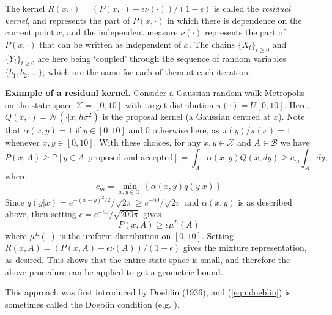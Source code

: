 \documentclass{article}
\newcommand{\ch}[1]{ \{#1_t\}_{t \geq 0} }
\newcommand{\X}{\mathcal{X}}
\newcommand{\B}{\mathcal{B}}
\begin{document}
The kernel $R(x,\cdot) = (P(x,\cdot) - \epsilon\nu(\cdot))/(1-\epsilon)$ is called the \emph{residual kernel}, and represents the part of $P(x,\cdot)$ in which there is dependence on the current point $x$, and the independent measure $\nu(\cdot)$ represents the part of $P(x,\cdot)$ that can be written as independent of $x$.  The chains $\ch{X}$ and $\ch{Y}$ are here being `coupled' through the sequence of random variables $\{b_1,b_2,...\}$, which are the same for each of them at each iteration.

\vspace{0.3cm}

{\color{darkblue}
\textbf{Example of a residual kernel.}  Consider a Gaussian random walk Metropolis on the state space $\X = [0,10]$ with target distribution $\pi(\cdot) = U[0,10]$. Here,  $Q(x,\cdot) = \mathcal{N}(\cdot|x,h\sigma^2)$ is the proposal kernel (a Gaussian centred at $x$).  Note that $\alpha(x,y) = 1$ if $y \in [0,10]$ and $0$ otherwise here, as $\pi(y)/\pi(x) = 1$ whenever $x,y \in [0,10]$.  With these choices, for any $x,y \in \X$ and $A \in \B$ we have
\[
P(x,A) \geq \mathbb{P}[y \in A ~~ \text{proposed and accepted}] = \int_A \alpha(x,y)Q(x,dy) \geq c_m\int_A  dy,
\]
where
\[
c_m = \min_{x,y \in \X}\left\{\alpha(x,y)q(y|x)\right\}
\]
Since $q(y|x) = e^{-(x-y)^2/2}/\sqrt{2\pi} \geq e^{-50}/\sqrt{2\pi}$ and $\alpha(x,y)$ is as described above, then setting $\epsilon = e^{-50}/\sqrt{200\pi}$ gives
\[
P(x,A) \geq \epsilon \mu^L(A)
\]
where $\mu^L(\cdot)$ is the uniform distribution on $[0,10]$.  Setting $R(x,A) = (P(x,A) - \epsilon \nu(A))/(1-\epsilon)$ gives the mixture representation, as desired.  This shows that the entire state space is small, and therefore the above procedure can be applied to get a geometric bound.
}
\vspace{0.3cm}

This approach was first introduced by Doeblin (1936), and (\ref{eqn:doeblin}) is sometimes called the Doeblin condition (e.g. \cite{norris1997markov}).  
\end{document}
